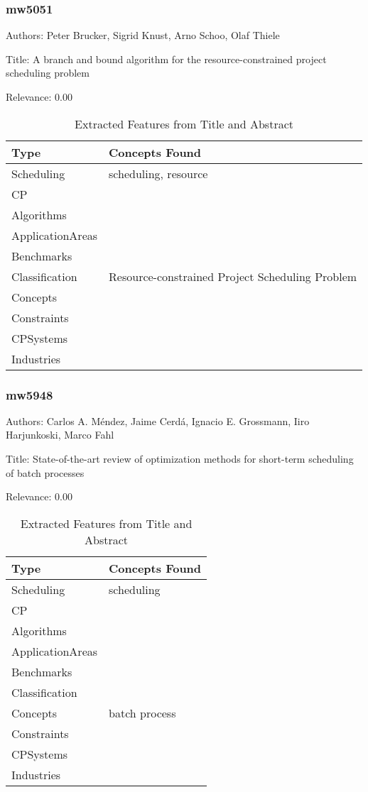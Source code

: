 \subsubsection{mw5051}
\label{mw:mw5051}

Authors: Peter Brucker, Sigrid Knust, Arno Schoo, Olaf Thiele

Title: A branch and bound algorithm for the resource-constrained project scheduling problem

Relevance:  0.00

{\scriptsize
\begin{longtable}{p{2cm}p{20cm}}
\caption{Extracted Features from Title and Abstract}\\ \toprule
Type & Concepts Found\\ \midrule
\endhead
\bottomrule
\endfoot
Scheduling & scheduling, resource\\ 
CP & \\ 
Algorithms & \\ 
ApplicationAreas & \\ 
Benchmarks & \\ 
Classification & Resource-constrained Project Scheduling Problem\\ 
Concepts & \\ 
Constraints & \\ 
CPSystems & \\ 
Industries & \\ 
\end{longtable}
}



\subsubsection{mw5948}
\label{mw:mw5948}

Authors: Carlos A. Méndez, Jaime Cerdá, Ignacio E. Grossmann, Iiro Harjunkoski, Marco Fahl

Title: State-of-the-art review of optimization methods for short-term scheduling of batch processes

Relevance:  0.00

{\scriptsize
\begin{longtable}{p{2cm}p{20cm}}
\caption{Extracted Features from Title and Abstract}\\ \toprule
Type & Concepts Found\\ \midrule
\endhead
\bottomrule
\endfoot
Scheduling & scheduling\\ 
CP & \\ 
Algorithms & \\ 
ApplicationAreas & \\ 
Benchmarks & \\ 
Classification & \\ 
Concepts & batch process\\ 
Constraints & \\ 
CPSystems & \\ 
Industries & \\ 
\end{longtable}
}



